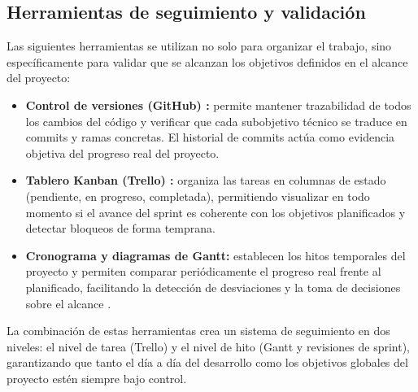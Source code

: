 \documentclass{article}
\begin{document}
{        \subsection{Herramientas de seguimiento y validación}
        \justify
        Las siguientes herramientas se utilizan no solo para organizar el trabajo, sino 
        específicamente para validar que se alcanzan los objetivos definidos en el alcance 
        del proyecto:

        \begin{itemize}
        \item \textbf{Control de versiones (GitHub) \cite{noauthor_acerca_nodate}:} 
        permite mantener trazabilidad de todos los cambios del código y verificar que 
        cada subobjetivo técnico se traduce en commits y ramas concretas. El historial 
        de commits actúa como evidencia objetiva del progreso real del proyecto.
        \item \textbf{Tablero Kanban (Trello) \cite{noauthor_que_nodate-8}:} organiza 
        las tareas en columnas de estado (pendiente, en progreso, completada), 
        permitiendo visualizar en todo momento si el avance del sprint es coherente 
        con los objetivos planificados y detectar bloqueos de forma temprana.
        \item \textbf{Cronograma y diagramas de Gantt:} establecen los hitos temporales 
        del proyecto y permiten comparar periódicamente el progreso real frente al 
        planificado, facilitando la detección de desviaciones y la toma de decisiones 
        sobre el alcance \cite{noauthor_que_nodate-9}.
        \end{itemize}

        \justify
        La combinación de estas herramientas crea un sistema de seguimiento en dos 
        niveles: el nivel de tarea (Trello) y el nivel de hito (Gantt y revisiones de 
        sprint), garantizando que tanto el día a día del desarrollo como los objetivos 
        globales del proyecto estén siempre bajo control.
        \par
    }

    \newpage
\end{document}
